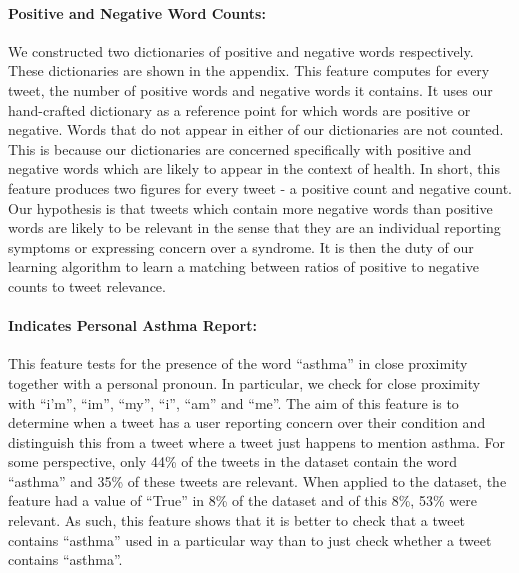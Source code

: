 \documentclass[10pt,letterpaper]{article}
\begin{document}
\paragraph{\textbf{Positive and Negative Word Counts:}} We constructed two dictionaries of positive and negative words respectively. These dictionaries are shown in the appendix. This feature computes for every tweet, the number of positive words and negative words it contains. It uses our hand-crafted dictionary as a reference point for which words are positive or negative. Words that do not appear in either of our dictionaries are not counted. This is because our dictionaries are concerned specifically with positive and negative words which are likely to appear in the context of health. In short, this feature produces two figures for every tweet - a positive count and negative count. Our hypothesis is that tweets which contain more negative words than positive words are likely to be relevant in the sense that they are an individual reporting symptoms or expressing concern over a syndrome. It is then the duty of our learning algorithm to learn a matching between ratios of positive to negative counts to tweet relevance.

\paragraph{\textbf{Indicates Personal Asthma Report:}} This feature tests for the presence of the word ``asthma'' in close proximity together with a personal pronoun. In particular, we check for close proximity with ``i'm'', ``im'', ``my'', ``i'', ``am'' and ``me''. The aim of this feature is to determine when a tweet has a user reporting concern over their condition and distinguish this from a tweet where a tweet just happens to mention asthma. For some perspective, only 44\% of the tweets in the dataset contain the word ``asthma'' and 35\% of these tweets are relevant. When applied to the dataset, the feature had a value of ``True'' in 8\% of the dataset and of this 8\%, 53\% were relevant. As such, this feature shows that it is better to check that a tweet contains ``asthma'' used in a particular way than to just check whether a tweet contains ``asthma''.
\end{document}

